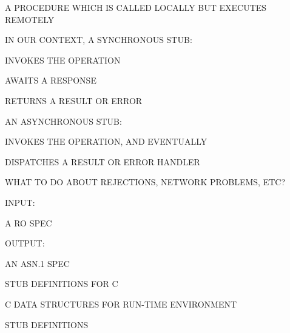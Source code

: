 \begin{bwslide}

\begin{nrtc}
\item	A PROCEDURE WHICH IS CALLED LOCALLY BUT EXECUTES REMOTELY

\item	IN OUR CONTEXT, A SYNCHRONOUS STUB:
    \begin{nrtc}
    \item	INVOKES THE OPERATION

    \item	AWAITS A RESPONSE

    \item	RETURNS A RESULT OR ERROR
    \end{nrtc}

\item	AN ASYNCHRONOUS STUB:
    \begin{nrtc}
    \item	INVOKES THE OPERATION, AND EVENTUALLY

    \item	DISPATCHES A RESULT OR ERROR HANDLER
    \end{nrtc}

\item	WHAT TO DO ABOUT REJECTIONS, NETWORK PROBLEMS, ETC?
\end{nrtc}
\end{bwslide}


\begin{bwslide}

\begin{nrtc}

\item	INPUT:
    \begin{nrtc}
    \item	A RO SPEC
    \end{nrtc}

\item	OUTPUT:
    \begin{nrtc}
    \item	AN ASN.1 SPEC

    \item	STUB DEFINITIONS FOR C

    \item	C DATA STRUCTURES FOR RUN-TIME ENVIRONMENT

    \item	STUB DEFINITIONS
    \end{nrtc}
\end{nrtc}
\end{bwslide}


